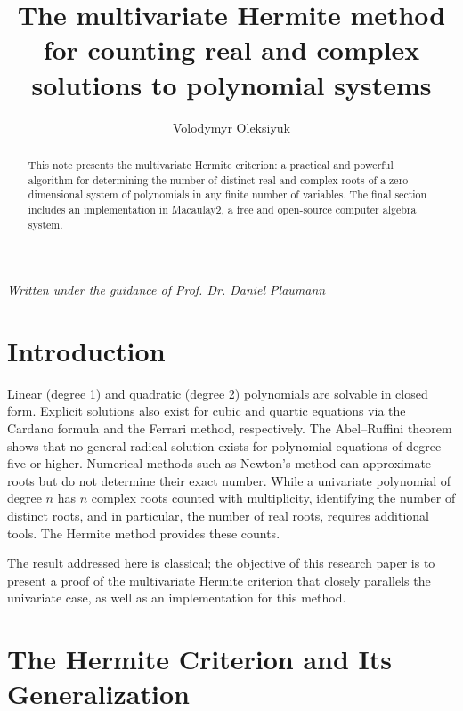 \documentclass{amsart}
\title[Multivariate Hermite Method]{The multivariate Hermite method for counting real and complex solutions to polynomial systems}
\author{Volodymyr Oleksiyuk}
\begin{document}
\newtheorem{lemma}{Lemma}
\theoremstyle{definition}
\newtheorem*{theorem}{Theorem}
\begin{abstract}

This note presents the multivariate Hermite criterion: a practical and powerful algorithm for determining the number of distinct real and complex roots of a zero-dimensional system of polynomials in any finite number of variables. The final section includes an implementation in Macaulay2, a free and open-source computer algebra system.

\end{abstract}

\maketitle

\vspace{2em}

\begin{center}
    \textit{Written under the guidance of Prof. Dr. Daniel Plaumann}
\end{center}

\vspace{2em}

\section{Introduction}

Linear (degree 1) and quadratic (degree 2) polynomials are solvable in closed form. Explicit solutions also exist for cubic and quartic equations via the Cardano formula and the Ferrari method, respectively. The Abel–Ruffini theorem shows that no general radical solution exists for polynomial equations of degree five or higher. Numerical methods such as Newton’s method can approximate roots but do not determine their exact number. While a univariate polynomial of degree $n$ has $n$ complex roots counted with multiplicity, identifying the number of distinct roots, and in particular, the number of real roots, requires additional tools. The Hermite method provides these counts.

The result addressed here is classical; the objective of this research paper is to present a proof of the multivariate Hermite criterion that closely parallels the univariate case, as well as an implementation for this method. 

\vspace{1em}

\section{The Hermite Criterion and Its Generalization}
\end{document}
